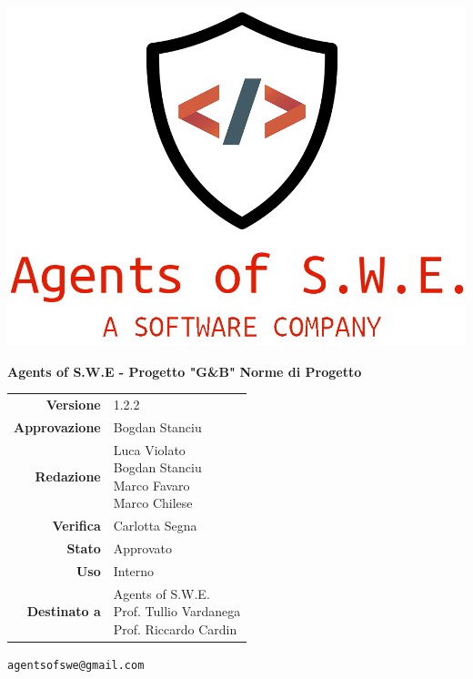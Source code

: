 


\begin{titlepage}
\thispagestyle{empty}

\begin{center}
\includegraphics[scale=0.3]{./images/logo.png} 

\large \textbf{Agents of S.W.E - Progetto "G\&B"}
\vfill
\Huge \textbf{Norme di Progetto}
\vfill
\large
\renewcommand{\arraystretch}{1.3}
\begin{tabular}{r|l}

\textbf{Versione} & 1.2.2\\

\textbf{Approvazione} & Bogdan Stanciu\\
\textbf{Redazione} & \parbox[t]{5cm}{Luca Violato\\Bogdan Stanciu\\Marco Favaro\\Marco Chilese}\\\
\textbf{Verifica} & \parbox[t]{5cm}{Carlotta Segna}\\
\textbf{Stato} & Approvato\\
\textbf{Uso} & Interno\\
\textbf{Destinato a} & \parbox[t]{5cm}{Agents of S.W.E. \\Prof. Tullio Vardanega\\Prof. Riccardo Cardin}
\end{tabular}
\vfill
\small
\texttt{agentsofswe@gmail.com}
\end{center}
\end{titlepage}

